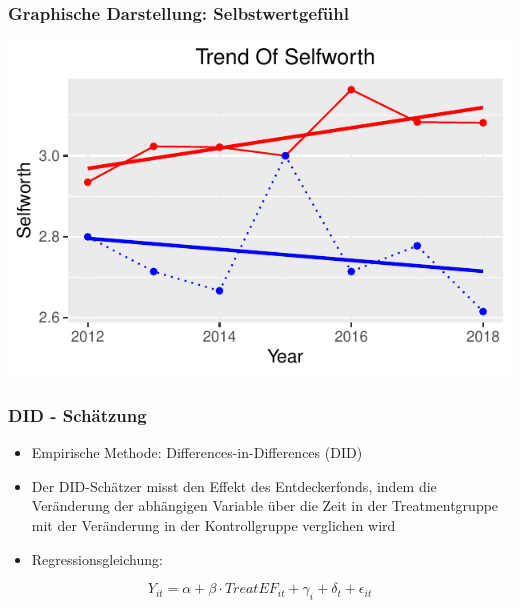 \begin{frame}[fragile]
\begin{itemize}
\begin{frame}
\begin{itemize}
\begin{frame}[fragile]
\begin{knitrout}
{}



\end{knitrout}
\end{frame}

\begin{frame}[fragile]
\frametitle{Graphische Darstellung: Selbstwertgefühl}
\begin{knitrout}\footnotesize
{}\color{fgcolor}

{\centering \includegraphics[width=\maxwidth]{figure/beamer-DIDSelfworthplot-1} 

}



\end{knitrout}
\end{frame}

\begin{frame}[fragile]
\frametitle{DID - Schätzung}
\begin{itemize}
\item Empirische Methode: Differences-in-Differences (DID)
\item Der DID-Schätzer misst den Effekt des Entdeckerfonds, indem die Veränderung der abhängigen Variable über die Zeit in der Treatmentgruppe mit der Veränderung in der Kontrollgruppe verglichen wird
\linebreak
\item Regressionsgleichung:
\end{itemize}

\begin{equation}
\label{DID equation}
  Y_{it} = \alpha + \beta \cdot TreatEF_{it} + \gamma_{i} + \delta_{t} + \epsilon_{it}
\end{equation}


\end{frame}
\end{itemize}
\end{frame}
\end{itemize}
\end{frame}
